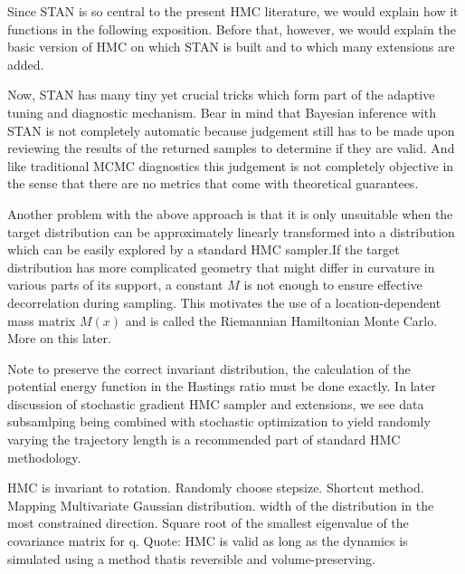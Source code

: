 \documentclass[]{report}
\begin{document}
Since STAN is so central to the present HMC literature, we would explain how it functions in the following exposition. Before that, however, we would explain the basic version of HMC on which STAN is built and to which many extensions are added. 












Now, STAN has many tiny yet crucial tricks which form part of the adaptive
tuning and diagnostic mechanism. Bear in mind that Bayesian inference with STAN is not completely
automatic because judgement still has to be made upon reviewing the results of
the returned samples to determine if they are valid. And like traditional MCMC
diagnostics this judgement is not completely objective in the sense that there
are no metrics that come with theoretical guarantees. 





Another problem with the above approach is that it is only unsuitable when the
target distribution can be approximately linearly transformed into a
distribution which can be easily explored by a standard HMC sampler.If the target
distribution has more complicated geometry that might differ in
curvature in various parts of its support, a constant $M$ is not enough to ensure
effective decorrelation during sampling. This motivates the use of
a location-dependent mass matrix $M(x)$ and is called the Riemannian Hamiltonian
Monte Carlo. More on this later. 






Note to preserve the correct invariant distribution, the calculation of the
potential energy function in the Hastings ratio must be done exactly. In later
discussion of stochastic gradient HMC sampler and extensions, we see data
subsamlping being combined with stochastic optimization to yield 
randomly varying the trajectory length is a recommended part of standard HMC
methodology. 

HMC is invariant to rotation.
Randomly choose stepsize. 
Shortcut method.
Mapping Multivariate Gaussian distribution. width of the distribution in the most constrained direction. Square root of the smallest eigenvalue of the covariance matrix for q.
Quote: HMC is valid as long as the dynamics is simulated using a method thatis reversible and volume-preserving. 
\end{document}
